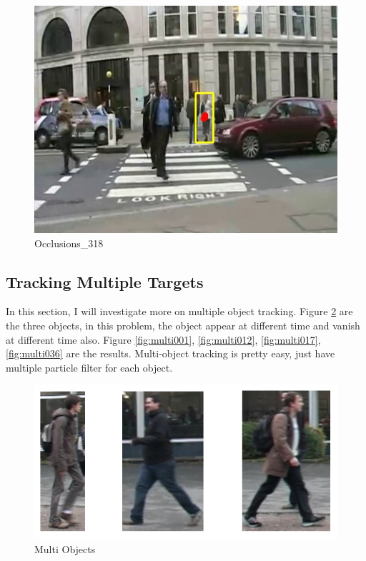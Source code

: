 \documentclass[10pt, conference, compsocconf]{IEEEtran}
\begin{document}
\begin{figure}[H]
	\centering
	\includegraphics[scale = 0.50]{image/p3/318.jpg}
	\caption{Occlusions\_318}
	\label{fig:p3_318}
\end{figure}

\subsection{Tracking Multiple Targets}
In this section, I will investigate more on multiple object tracking. Figure \ref{fig:multi} are the three objects, in this problem, the object appear at different time and vanish at different time also. Figure \ref{fig:multi001}, \ref{fig:multi012}, \ref{fig:multi017}, \ref{fig:multi036} are the results. Multi-object tracking is pretty easy, just have multiple particle filter for each object.  
\begin{figure}[H]
	\centering
	\includegraphics[scale = 0.30]{image/multi.png}
	\caption{Multi Objects}
	\label{fig:multi}
\end{figure}
\end{document}
